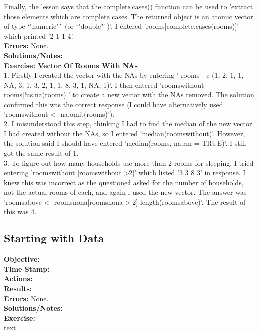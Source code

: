 \documentclass{article}
\begin{document}
\begin{FlushLeft}
Finally, the lesson says that the complete.cases() function can be used to 'extract those elements which are complete cases. The returned object is an atomic vector of type `"numeric"` (or `"double"`)'. I entered 'rooms[complete.cases(rooms)]' which printed '2 1 1 4'. \\
\textbf{Errors:} None.\\
\textbf{Solutions/Notes:}\\
\vspace{5mm}
\textbf{Exercise: Vector Of Rooms With NAs}\\ 
1. Firstly I created the vector with the NAs by entering ' rooms \lessthan - c (1, 2, 1, 1, NA, 3, 1, 3, 2, 1, 1, 8, 3, 1, NA, 1)'. I then entered 'rooms\textunderscore without \lessthan - rooms[!us.na(rooms)]' to create a new vector with the NAs removed. The solution confirmed this was the correct response (I could have alternatively used 'rooms\textunderscore without \textless - na.omit(rooms)').\\
2. I misunderstood this step, thinking I had to find the median of the new vector I had created without the NAs, so I entered 'median(rooms\textunderscore without)'. However, the solution said I should have entered 'median(rooms, na.rm = TRUE)'. I still got the same result of 1.\\
3. To figure out how many households use more than 2 rooms for sleeping, I tried entering 'rooms\textunderscore without [rooms\textunderscore without \textgreater 2]' which listed '3 3 8 3' in response. I knew this was incorrect as the questioned asked for the number of households, not the actual rooms of each, and again I used the new vector. The answer was 'rooms\textunderscore above \textless - rooms\textu no\textunderscore na[rooms\textunderscore no\textunderscore na \textgreater{} 2]
length(rooms\textunderscore above)'. The result of this was 4.\\

\subsection{Starting with Data}
\textbf{Objective: }\\ 
\textbf{Time Stamp:} \\
\textbf{Actions:} \\
\textbf{Results:}\\
\textbf{Errors:} None.\\
\textbf{Solutions/Notes:}\\
\vspace{5mm}
\textbf{Exercise: }\\ 
text\\


\end{FlushLeft}
\end{document}
